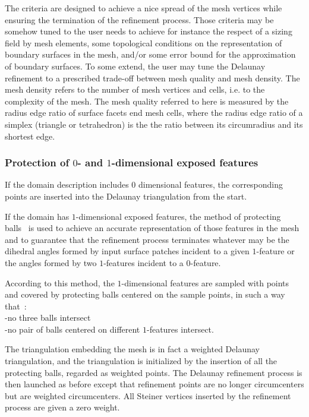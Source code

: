 The criteria are designed to achieve a nice spread of the mesh vertices
while ensuring the termination of the refinement process.
Those criteria  may  be  somehow tuned  to  the user needs 
to achieve for instance the respect of a sizing field by mesh elements,
some topological conditions on the representation of boundary surfaces  in the mesh,
and/or some error bound for the approximation of boundary surfaces.
To some extend, the user may  tune the Delaunay refinement 
to a prescribed trade-off
between mesh quality and  mesh density. 
The mesh density refers to the number of mesh vertices and cells,
i.e. to the complexity of the mesh.
The mesh quality referred to here is  measured by the radius edge
ratio of surface facets end mesh cells, where the radius edge ratio of
a simplex (triangle or tetrahedron) is the
the ratio between its circumradius  and  its shortest edge.

 
\subsubsection{Protection of $0$- and $1$-dimensional exposed features}

If the domain description includes $0$ dimensional features,
the corresponding  points are inserted into the Delaunay triangulation 
from the start.

If the domain has $1$-dimensional exposed features,
the method of protecting balls~\cite{cgal:cdr-drpsc-07, cgal:cdl-pdma-07}
is used to achieve an accurate representation of those features in the mesh
and to guarantee that the refinement process terminates
whatever may be the dihedral  angles formed by input  surface patches incident to a
given $1$-feature or the  angles formed by two $1$-features incident to a  $0$-feature.

According to this method,  the $1$-dimensional features are 
sampled with points and covered by protecting balls centered on the sample points,
 in such a way that~:\\
-no three balls intersect \\
-no pair of balls centered on different $1$-features intersect.

The  triangulation embedding the mesh is in fact 
a weighted Delaunay triangulation, and the  triangulation 
is initialized by the insertion of all the protecting
balls, regarded as weighted points.
The Delaunay refinement process
is then launched  as before except that refinement points
are no longer circumcenters but are 
 weighted circumcenters.
All Steiner vertices inserted by the refinement process are given a zero weight.

